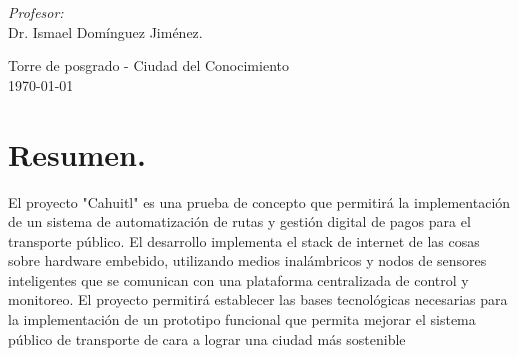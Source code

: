 \documentclass[10pt]{article}
\begin{document}
\begin{center}
\begin{minipage}{0.46\textwidth}
\begin{flushleft}
\end{flushleft}																		%
\end{minipage}		
\begin{minipage}{0.52\textwidth}		
\vspace{-0.6cm}											%
\begin{flushright} \large															%
\emph{Profesor:} \\																	%
Dr. Ismael Domínguez Jiménez.\\
\end{flushright}																	%
\end{minipage}	
\vspace*{1cm}
 	
\vspace{2cm} 																				
\begin{center}	
Torre de posgrado - Ciudad del Conocimiento \\
{\large \today}																	%
 			\end{center}												  						
\end{center}							 											
																					
\newpage																		

\tableofcontents 

\newpage

\section{Resumen.}


El proyecto "Cahuitl" es una prueba de concepto que permitirá la implementación de un sistema de automatización de rutas y gestión digital de pagos para el transporte público. El desarrollo implementa el stack de internet de las cosas sobre hardware embebido, utilizando medios inalámbricos y nodos de sensores inteligentes que se comunican con una plataforma centralizada de control y monitoreo. El proyecto permitirá establecer las bases tecnológicas necesarias para la implementación de un prototipo funcional que permita mejorar el sistema público de transporte de cara a lograr una ciudad más sostenible 
\cite{IEEEreferencias:Ref1}
\end{document}
